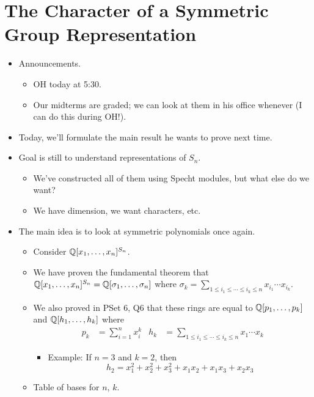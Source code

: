 \documentclass[../notes.tex]{subfiles}
\begin{document}
\section{The Character of a Symmetric Group Representation}
\begin{itemize}
    \item {}Announcements.
    \begin{itemize}
        \item OH today at 5:30.
        \item Our midterms are graded; we can look at them in his office whenever (I can do this during OH!).
    \end{itemize}
    \item Today, we'll formulate the main result he wants to prove next time.
    \item Goal is still to understand representations of $S_n$.
    \begin{itemize}
        \item We've constructed all of them using Specht modules, but what else do we want?
        \item We have dimension, we want characters, etc.
    \end{itemize}
    \item The main idea is to look at symmetric polynomials once again.
    \begin{itemize}
        \item Consider $\mathbb{Q}[x_1,\dots,x_n]^{S_n}$.
        \item We have proven the fundamental theorem that $\mathbb{Q}[x_1,\dots,x_n]^{S_n}=\mathbb{Q}[\sigma_1,\dots,\sigma_n]$ where $\sigma_k=\sum_{1\leq i_1\leq\cdots\leq i_k\leq n}x_{i_1}\cdots x_{i_k}$.
        \item We also proved in PSet 6, Q6 that these rings are equal to $\mathbb{Q}[p_1,\dots,p_k]$ and $\mathbb{Q}[h_1,\dots,h_k]$ where
        \begin{align*}
            p_k &= \sum_{i=1}^nx_i^k&
            h_k &= \sum_{1\leq i_1\leq\cdots\leq i_k\leq n}x_1\cdots x_k
        \end{align*}
        \begin{itemize}
            \item Example: If $n=3$ and $k=2$, then
            \begin{equation*}
                h_2 = x_1^2+x_2^2+x_3^2+x_1x_2+x_1x_3+x_2x_3
            \end{equation*}
        \end{itemize}
        \item Table of bases for $n$, $k$.

\end{itemize}
\end{itemize}
\end{document}
